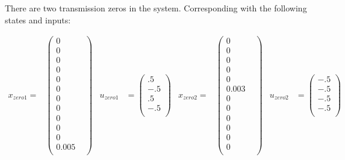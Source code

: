 \documentclass[]{article}
\begin{document}
There are two transmission zeros in the system. Corresponding with the following states and inputs:

\begin{align*}
x_{zero1}=&\begin{pmatrix}
0 & \\ 
0 & \\ 
0 & \\ 
0 & \\ 
0 & \\ 
0 & \\ 
0 & \\ 
0 & \\ 
0 & \\ 
0 & \\ 
0 & \\ 
0.005 \\
\end{pmatrix}
&  u_{zero1} &= \begin{pmatrix}
.5 \\
-.5 \\
.5 \\
-.5 \\
\end{pmatrix} & x_{zero2} =&\begin{pmatrix}
0 & \\ 
0 & \\ 
0 & \\ 
0 & \\ 
0 & \\ 
0.003 & \\ 
0 & \\ 
0 & \\ 
0 & \\ 
0 & \\ 
0 & \\ 
0 \\
\end{pmatrix}
&  u_{zero2} &= \begin{pmatrix}
-.5 \\
-.5 \\
-.5 \\
-.5 \\
\end{pmatrix}
\end{align*}
\end{document}
